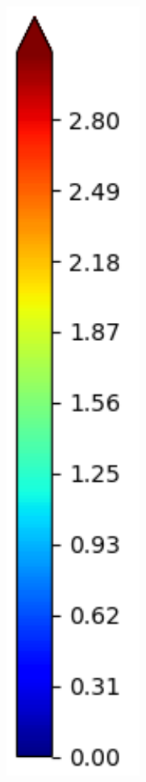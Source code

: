\documentclass[journal=jpcbfk,manuscript=article]{achemso}
\begin{document}
\begin{figure}[!htb]
\begin{subfigure}{0.1\textwidth}
		\includegraphics[width=\linewidth]{colorbar_jet.pdf}

\end{subfigure}
\end{figure}
\end{document}
